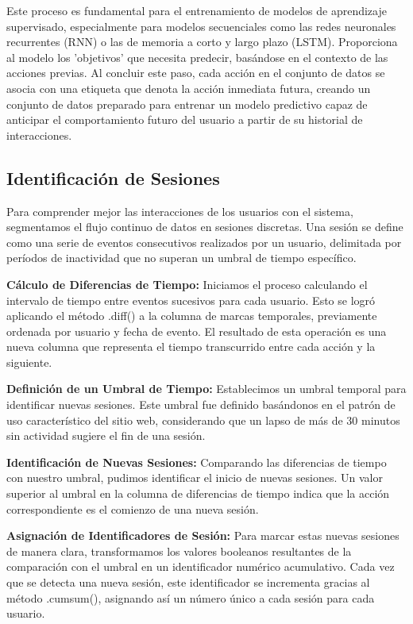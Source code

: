 Este proceso es fundamental para el entrenamiento de modelos de aprendizaje supervisado, especialmente para modelos secuenciales como las redes neuronales recurrentes (RNN) o las de memoria a corto y largo plazo (LSTM). Proporciona al modelo los 'objetivos' que necesita predecir, basándose en el contexto de las acciones previas. Al concluir este paso, cada acción en el conjunto de datos se asocia con una etiqueta que denota la acción inmediata futura, creando un conjunto de datos preparado para entrenar un modelo predictivo capaz de anticipar el comportamiento futuro del usuario a partir de su historial de interacciones.

\subsection{Identificación de Sesiones}

Para comprender mejor las interacciones de los usuarios con el sistema, segmentamos el flujo continuo de datos en sesiones discretas. Una sesión se define como una serie de eventos consecutivos realizados por un usuario, delimitada por períodos de inactividad que no superan un umbral de tiempo específico.

\textbf{Cálculo de Diferencias de Tiempo:} Iniciamos el proceso calculando el intervalo de tiempo entre eventos sucesivos para cada usuario. Esto se logró aplicando el método .diff() a la columna de marcas temporales, previamente ordenada por usuario y fecha de evento. El resultado de esta operación es una nueva columna que representa el tiempo transcurrido entre cada acción y la siguiente.

\textbf{Definición de un Umbral de Tiempo:} Establecimos un umbral temporal para identificar nuevas sesiones. Este umbral fue definido basándonos en el patrón de uso característico del sitio web, considerando que un lapso de más de 30 minutos sin actividad sugiere el fin de una sesión.

\textbf{Identificación de Nuevas Sesiones:} Comparando las diferencias de tiempo con nuestro umbral, pudimos identificar el inicio de nuevas sesiones. Un valor superior al umbral en la columna de diferencias de tiempo indica que la acción correspondiente es el comienzo de una nueva sesión.

\textbf{Asignación de Identificadores de Sesión:} Para marcar estas nuevas sesiones de manera clara, transformamos los valores booleanos resultantes de la comparación con el umbral en un identificador numérico acumulativo. Cada vez que se detecta una nueva sesión, este identificador se incrementa gracias al método .cumsum(), asignando así un número único a cada sesión para cada usuario.

